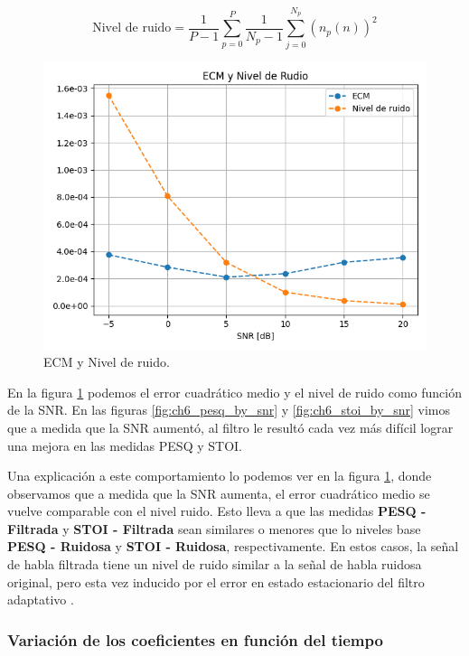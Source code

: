 \begin{equation*}
	\text{Nivel de ruido} = \frac{1}{P-1} \sum_{p=0}^{P} \frac{1}{N_p-1} \sum_{j=0}^{N_p} (n_p(n))^2
\end{equation*}

\begin{figure}
	\centering
	\centerline{\includegraphics[scale=0.8]{images/ch6/ecm_and_noise_level.png}}
	\caption{ECM y Nivel de ruido.}
	\label{fig:ch6_mse_and_noise_level}
\end{figure}

En la figura \ref{fig:ch6_mse_and_noise_level} podemos el error cuadrático medio y el nivel de ruido como función de la SNR. En las figuras \ref{fig:ch6_pesq_by_snr} y \ref{fig:ch6_stoi_by_snr} vimos que a medida que la SNR aumentó, al filtro le resultó cada vez más difícil lograr una mejora en las medidas PESQ y STOI. 

Una explicación a este comportamiento lo podemos ver en la figura \ref{fig:ch6_mse_and_noise_level}, donde observamos que a medida que la SNR aumenta, el error cuadrático medio se vuelve comparable con el nivel ruido. Esto lleva a que las medidas  \textbf{PESQ - Filtrada} y \textbf{STOI - Filtrada} sean similares o menores que lo niveles base \textbf{PESQ - Ruidosa} y \textbf{STOI - Ruidosa}, respectivamente. En estos casos, la señal de habla filtrada tiene un nivel de ruido similar a la señal de habla ruidosa original, pero esta vez inducido por el error en estado estacionario del filtro adaptativo \cite{fundamentals_of_adaptive_filtering}.

\subsubsection{Variación de los coeficientes en función del tiempo}

